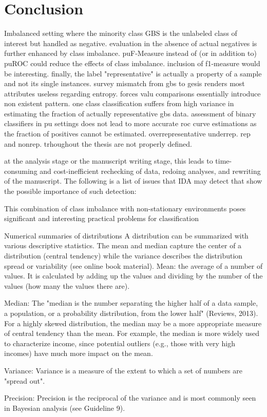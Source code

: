 \chapter{Conclusion}\label{Sec:Conclusion}


Imbalanced setting where the minority class GBS is the unlabeled class of interest but handled as negative. evaluation in the absence of actual negatives is further enhanced by class imbalance. puF-Measure instead of (or in addition to) puROC could reduce the effects of class imbalance. inclusion of f1-measure would be interesting. finally, the label "representative" is actually a property of a sample and not its single instances. survey mismatch from gbs to gesis renders most attributes useless regarding entropy. forces valu comparisons essentially introduce non existent pattern. one class classification suffers from high variance in estimating the fraction of actually representative gbs data. assessment of binary classifiers in pu settings does not lead to more accurate roc curve estimations as the fraction of positives cannot be estimated. overrepresentative underrep. rep and nonrep. trhoughout the thesis are not properly defined.

at the analysis stage or the manuscript writing stage, this leads to time-consuming and cost-inefficient rechecking of data, redoing analyses, and rewriting of the manuscript. The following is a list of issues that IDA may detect that show the possible importance of such detection:

This combination of class imbalance with non-stationary environments poses signiﬁcant and interesting practical problems for classiﬁcation


Numerical summaries of distributions
A distribution can be summarized with various descriptive statistics. The mean and median capture the center of a distribution (central tendency) while the variance describes the distribution spread or variability (see online book material).  
Mean: the average of a number of values. It is calculated by adding up the values and dividing by the number of the values (how many the values there are). 

Median: The "median is the number separating the higher half of a data sample, a population, or a probability distribution, from the lower half" (Reviews, 2013). For a highly skewed distribution, the median may be a more appropriate measure of central tendency than the mean. For example, the median is more widely used to characterize income, since potential outliers (e.g., those with very high incomes) have much more impact on the mean.
 
Variance: Variance is a measure of the extent to which a set of numbers are "spread out".

Precision: Precision is the reciprocal of the variance and is most commonly seen in Bayesian analysis (see Guideline 9).
